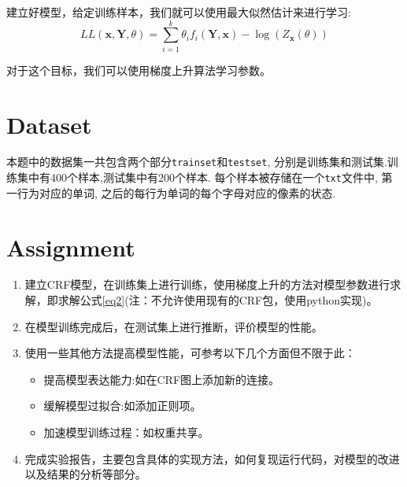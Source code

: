 \documentclass[a4paper,UTF8]{article}
\numberwithin{equation}{section}
\begin{document}
建立好模型，给定训练样本，我们就可以使用最大似然估计来进行学习:
\begin{equation}
    LL(\mathbf{x},\mathbf{Y},\theta) =\sum_{i=1}^{k} \theta_{i} f_{i}(\mathbf{Y}, \mathbf{x}) -\log \left(Z_{\mathbf{x}}(\theta)\right)\label{eq2}
\end{equation}

对于这个目标，我们可以使用梯度上升算法学习参数。

\section{Dataset}
本题中的数据集一共包含两个部分\texttt{trainset}和\texttt{testset}, 分别是训练集和测试集.训练集中有400个样本,测试集中有200个样本. 每个样本被存储在一个\texttt{txt}文件中, 第一行为对应的单词, 之后的每行为单词的每个字母对应的像素的状态.

\section{Assignment}
\begin{enumerate}
    \item 建立CRF模型，在训练集上进行训练，使用梯度上升的方法对模型参数进行求解，即求解公式\eqref{eq2}(注：不允许使用现有的CRF包，使用python实现)。
    \item 在模型训练完成后，在测试集上进行推断，评价模型的性能。
    \item 使用一些其他方法提高模型性能，可参考以下几个方面但不限于此：
    \begin{itemize}
        \item 提高模型表达能力:如在CRF图上添加新的连接。
        \item 缓解模型过拟合:如添加正则项。
        \item 加速模型训练过程：如权重共享。
    \end{itemize}
    \item 完成实验报告，主要包含具体的实现方法，如何复现运行代码，对模型的改进以及结果的分析等部分。
\end{enumerate}
\end{document}
